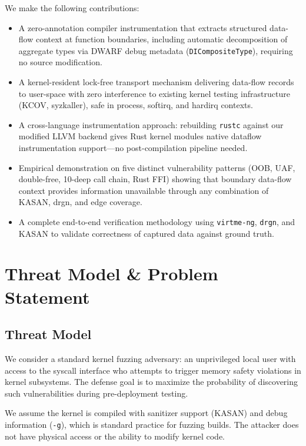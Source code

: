 \documentclass{ndss}
\begin{document}
We make the following contributions:
\begin{itemize}[nosep]
  \item A zero-annotation compiler instrumentation that extracts structured
        data-flow context at function boundaries, including automatic
        decomposition of aggregate types via DWARF debug metadata
        (\texttt{DICompositeType}), requiring no source modification.
  \item A kernel-resident lock-free transport mechanism delivering data-flow
        records to user-space with zero interference to existing kernel testing
        infrastructure (KCOV, syzkaller), safe in process, softirq, and hardirq
        contexts.
  \item A cross-language instrumentation approach: rebuilding \texttt{rustc}
        against our modified LLVM backend gives Rust kernel modules native
        dataflow instrumentation support---no post-compilation pipeline needed.
  \item Empirical demonstration on five distinct vulnerability patterns (OOB,
        UAF, double-free, 10-deep call chain, Rust FFI) showing that boundary
        data-flow context provides information unavailable through any
        combination of KASAN, drgn, and edge coverage.
  \item A complete end-to-end verification methodology using \texttt{virtme-ng},
        \texttt{drgn}, and KASAN to validate correctness of captured data
        against ground truth.
\end{itemize}


\section{Threat Model \& Problem Statement}\label{sec:threat}

\subsection{Threat Model}

We consider a standard kernel fuzzing adversary: an unprivileged local user
with access to the syscall interface who attempts to trigger memory safety
violations in kernel subsystems. The defense goal is to maximize the
probability of discovering such vulnerabilities during pre-deployment testing.

We assume the kernel is compiled with sanitizer support (KASAN) and debug
information (\texttt{-g}), which is standard practice for fuzzing builds. The
attacker does not have physical access or the ability to modify kernel code.
\end{document}
